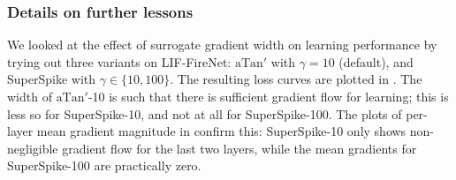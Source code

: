 
\subsubsection*{Details on further lessons}\label{app:neurips_lessons}

We looked at the effect of surrogate gradient width on learning performance by trying out three variants on LIF-FireNet: $\text{aTan}'$ with $\gamma=10$ (default), and SuperSpike \cite{zenke2018superspike} with $\gamma \in \{10, 100\}$. %
The resulting loss curves are plotted in . The width of $\text{aTan}'$-10 is such that there is sufficient gradient flow for learning; this is less so for SuperSpike-10, and not at all for SuperSpike-100. The plots of per-layer mean gradient magnitude in  confirm this: SuperSpike-10 only shows non-negligible gradient flow for the last two layers, while the mean gradients for SuperSpike-100 are practically zero.


